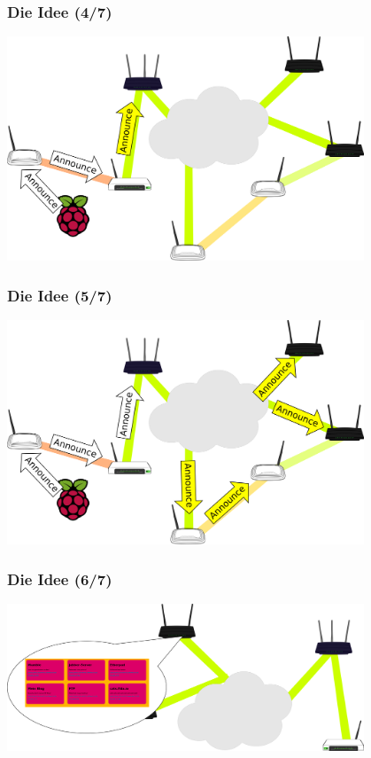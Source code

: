 \documentclass[accentcolor=tud6b,colorbacktitle,inverttitle,landscape,german,presentation,t]{tudbeamer}
\begin{document}
	\begin{frame}
		\frametitle{Die Idee (4/7)}
		\begin{center}
			\vspace{0cm}
			\includegraphics[width=0.8\textwidth]{images/service-discovery4}
			\vspace{0.4cm}
		\end{center}
		
	\end{frame}
	\begin{frame}
		\frametitle{Die Idee (5/7)}
		\begin{center}
			\vspace{0cm}
			\includegraphics[width=0.8\textwidth]{images/service-discovery5}
			\vspace{0.4cm}
		\end{center}
		
	\end{frame}
	\begin{frame}
		\frametitle{Die Idee (6/7)}
		\begin{center}
			\vspace{0cm}
			\includegraphics[width=0.8\textwidth]{images/service-discovery6}
			\vspace{0.4cm}
		\end{center}
		
	\end{frame}
\end{document}
